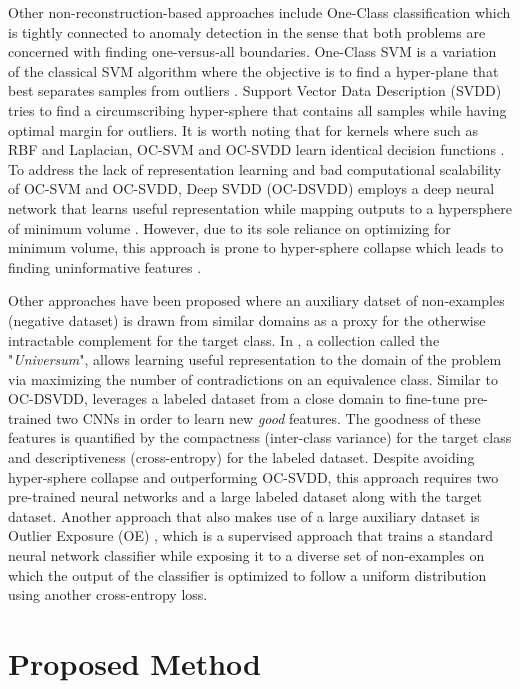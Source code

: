 \documentclass[acmtog, nonacm]{acmart}
\begin{document}
Other non-reconstruction-based approaches include One-Class classification which is tightly connected to anomaly detection in the sense that both problems are concerned with finding one-versus-all boundaries. One-Class SVM is a variation of the classical SVM algorithm \cite{cortes1995support} where the objective is to find a hyper-plane that best separates samples from outliers \cite{scholkopf2001estimating}. Support Vector Data Description (SVDD)\cite{tax2004support} tries to find a circumscribing hyper-sphere that contains all samples while having optimal margin for outliers. It is worth noting that for kernels where  such as  RBF and Laplacian, OC-SVM and OC-SVDD learn identical decision functions \cite{lampert2009kernel}. To address the lack of representation learning and bad computational scalability of OC-SVM and OC-SVDD, Deep SVDD (OC-DSVDD) employs a deep neural network that learns useful representation while mapping outputs to a hypersphere of minimum volume \cite{ruff2018deep}. However, due to its sole reliance  on optimizing for minimum volume, this approach is prone to hyper-sphere collapse which leads to finding uninformative features \cite{perera2019learning}.

Other approaches have been proposed where an auxiliary datset of non-examples (negative dataset) is drawn from similar domains as a proxy for the otherwise intractable complement for the target class. In \cite{weston2006inference}, a collection called the "\textit{Universum}", allows learning useful representation to the domain of the problem via maximizing the number of contradictions on an equivalence class.
Similar to OC-DSVDD, \cite{perera2019learning} leverages a labeled dataset from a close domain to fine-tune pre-trained two CNNs in order to learn new \textit{good} features. The goodness of these features is quantified by the compactness (inter-class variance) for the target class and descriptiveness (cross-entropy) for the labeled dataset. Despite avoiding hyper-sphere collapse and outperforming OC-SVDD, this approach requires two pre-trained neural networks and a large labeled dataset along with the target dataset. Another approach that also makes use of a large auxiliary dataset is Outlier Exposure (OE) \cite{hendrycks2018deep}, which is a supervised approach that trains a standard neural network classifier while exposing it to a diverse set of non-examples on which the output of the classifier is optimized to follow a uniform distribution using another cross-entropy loss.
\section{Proposed Method}
\end{document}
